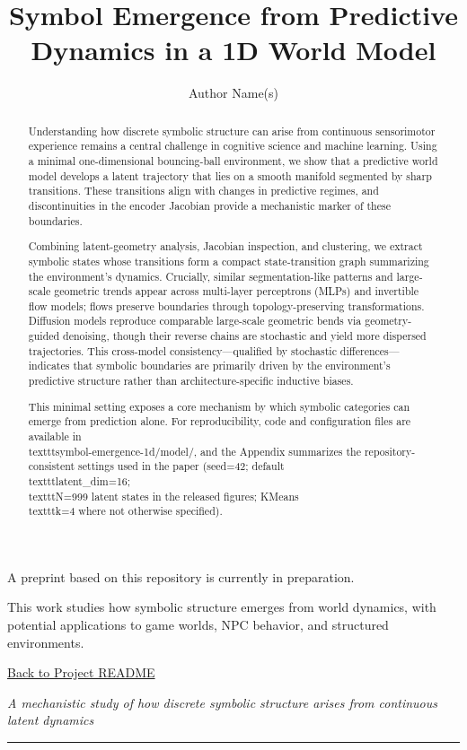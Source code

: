 \documentclass[11pt]{article}
\title{Symbol Emergence from Predictive Dynamics in a 1D World Model}
\author{Author Name(s)}
\date{}
\begin{document}
\maketitle
A preprint based on this repository is currently in preparation.

This work studies how symbolic structure emerges from world dynamics, with potential applications to game worlds, NPC behavior, and structured environments.

\begin{center}
\vspace{-1em}
\href{../README.md}{Back to Project README}
\end{center}



\emph{A mechanistic study of how discrete symbolic structure arises from continuous latent dynamics}

\bigskip\hrule\bigskip
\begin{abstract}
Understanding how discrete symbolic structure can arise from continuous sensorimotor experience remains a central challenge in cognitive science and machine learning. Using a minimal one-dimensional bouncing-ball environment, we show that a predictive world model develops a latent trajectory that lies on a smooth manifold segmented by sharp transitions. These transitions align with changes in predictive regimes, and discontinuities in the encoder Jacobian provide a mechanistic marker of these boundaries.

Combining latent-geometry analysis, Jacobian inspection, and clustering, we extract symbolic states whose transitions form a compact state-transition graph summarizing the environment's dynamics. Crucially, similar segmentation-like patterns and large-scale geometric trends appear across multi-layer perceptrons (MLPs) and invertible flow models; flows preserve boundaries through topology-preserving transformations. Diffusion models reproduce comparable large-scale geometric bends via geometry-guided denoising, though their reverse chains are stochastic and yield more dispersed trajectories. This cross-model consistency—qualified by stochastic differences—indicates that symbolic boundaries are primarily driven by the environment's predictive structure rather than architecture-specific inductive biases.

This minimal setting exposes a core mechanism by which symbolic categories can emerge from prediction alone. For reproducibility, code and configuration files are available in \\texttt{symbol-emergence-1d/model/}, and the Appendix summarizes the repository-consistent settings used in the paper (seed=42; default \\texttt{latent_dim=16}; \\texttt{N=999} latent states in the released figures; KMeans \\texttt{k=4} where not otherwise specified).

\end{abstract}
\end{document}
